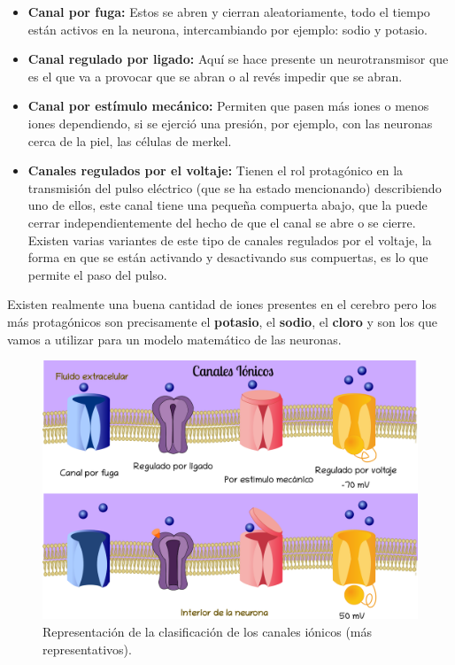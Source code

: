\begin{itemize}
\item \textbf{Canal por fuga:} Estos se abren y cierran aleatoriamente, todo el tiempo están activos en la neurona, intercambiando por ejemplo: sodio y potasio.
\item \textbf{Canal regulado por ligado:} Aquí se hace presente un neurotransmisor que es el que va a provocar que se abran o al revés impedir que se abran.
\item  \textbf{Canal por estímulo mecánico:} Permiten que pasen más iones o menos iones dependiendo, si se ejerció una presión, por ejemplo, con las neuronas cerca
de la piel, las células de merkel.
\item \textbf{Canales regulados por el voltaje:} Tienen el rol protagónico en la transmisión del pulso eléctrico (que se ha estado mencionando) describiendo uno de ellos, este canal tiene una pequeña compuerta abajo, que la puede cerrar independientemente del hecho de que el canal se abre o se cierre. Existen varias variantes de este tipo de canales regulados por el voltaje, la forma en que se están activando y desactivando sus compuertas, es lo que permite el paso del pulso.
\end{itemize}

Existen realmente una buena cantidad de iones presentes en el cerebro pero los más protagónicos son precisamente el \textbf{potasio}, el \textbf{sodio}, el \textbf{cloro} y son los que vamos a utilizar para un modelo matemático de las neuronas. 

\begin{figure}[h]
 \centering
 \includegraphics[scale=0.28]{../Figuras/canalesIonicos.png}
 \caption{Representación de la clasificación de los canales iónicos (más representativos).}
 \label{fig:MembranaP}
\end{figure}


